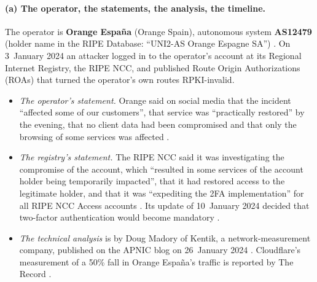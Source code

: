 \documentclass[11pt,a4paper]{article}
\begin{document}
\paragraph{(a) The operator, the statements, the analysis, the timeline.} The operator is \textbf{Orange España}
(Orange Spain), autonomous system \textbf{AS12479} (holder name in the RIPE Database: ``UNI2-AS Orange Espagne SA'')
\cite{ripestat}. On 3~January 2024 an attacker logged in to the operator's account at its Regional Internet Registry,
the RIPE NCC, and published Route Origin Authorizations (ROAs) that turned the operator's own routes RPKI-invalid.
\begin{itemize}
\item \emph{The operator's statement.} Orange said on social media that the incident ``affected some of our customers'', that
service was ``practically restored'' by the evening, that no client data had been compromised and that only the browsing of some
services was affected \cite{record}.
\item \emph{The registry's statement.} The RIPE NCC said it was investigating the compromise of the account, which ``resulted in
some services of the account holder being temporarily impacted'', that it had restored access to the legitimate holder, and that it
was ``expediting the 2FA implementation'' for all RIPE NCC Access accounts \cite{record}. Its update of 10~January 2024 decided that
two-factor authentication would become mandatory \cite{ripeupdate}.
\item \emph{The technical analysis} is by Doug Madory of Kentik, a network-measurement company, published on the APNIC blog on
26~January 2024 \cite{apnic}. Cloudflare's measurement of a 50\% fall in Orange España's traffic is reported by The Record
\cite{record}.
\end{itemize}
\end{document}
